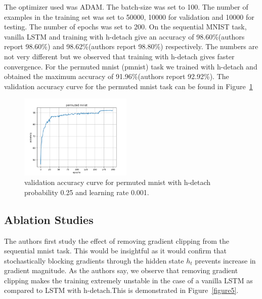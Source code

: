 The optimizer used was ADAM. The batch-size was set to 100. The number of examples in the training set was set to 50000, 10000 for validation and 10000 for testing. The number of epochs was set to 200. On the sequential MNIST task, vanilla LSTM and training with h-detach give an accuracy of 98.60\%(authors report 98.60\%) and 98.62\%(authors report 98.80\%) respectively. The numbers are not very different but we observed that training with h-detach gives faster convergence.
For the permuted mnist (pmnist) task we trained with h-detach and obtained the maximum accuracy of 91.96\%(authors report 92.92\%). The validation accuracy curve for the permuted mnist task can be found in Figure~\ref{figure4}



\begin{figure}[h]
\begin{center}
 \includegraphics[width=\linewidth,height=4cm]{figures/pmnist.png}

\end{center}
\caption{validation accuracy curve for permuted mnist with h-detach probability 0.25 and learning rate 0.001.}
\label{figure4}
\end{figure}


\subsection{Ablation Studies}
The authors first study the effect of removing gradient clipping from the sequential mnist task. This would be insightful as it would confirm that stochastically blocking gradients through the hidden state $h_t$ prevents increase in gradient magnitude. As the authors say, we observe that removing gradient clipping makes the training extremely unstable in the case of a vanilla LSTM as compared to LSTM with h-detach.This is demonstrated in Figure~\ref{figure5}.

